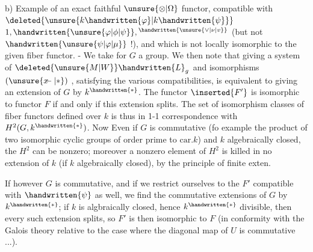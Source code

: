 
b) Example of an exact faithful $\unsure{\otimes|\Omega}$ functor, compatible with $\deleted{\unsure{k\handwritten{\varphi}|k\handwritten{\psi}}}$ $1,\handwritten{\unsure{\varphi|\phi|\psi}},{}^{\handwritten{\unsure{\vee|\nu|v}}}$ (but not  $\handwritten{\unsure{\psi|\varphi|\mu}}$ !), and which is not locally isomorphic to the given fiber functor. - We take for $G$ a group. We then note that giving a system of $\deleted{\unsure{M|W}}\handwritten{L}_{g}$ and isomorphisms $(\unsure{\rlap{\(x\)}-|*})$ , satisfying the various compatibilities, is equivalent to giving an extension of $G$ by $k^{\handwritten{*}}$. The functor $\inserted{F'}$ is isomorphic to  functor $F$ if and only if this extension splits. The set of isomorphism classes of fiber functors defined over $k$ is thus in 1-1 correspondence with $H^{2}(G,k^{\handwritten{*}})$. Now Even if $G$ is commutative (fo example the product of two isomorphic cyclic groups of order prime to  $\mathrm{car}.k$) and $k$ algebraically closed, the $H^{2}$ can be nonzero;  moreover a nonzero element of $H^{2}$ is killed in no extension of $k$ (if $k$ algebraically closed), by the principle of finite exten.

If however $G$ is commutative, and if we restrict ourselves to the $F'$ compatible with $\handwritten{\psi}$ as well, we find the commutative extensions of $G$ by $k^{\handwritten{*}}$; if $k$ is algbraically closed, hence $k^{\handwritten{*}}$ divisible, then every such extension splits, so $F'$ is then isomorphic to $F$ (in conformity with the Galois theory relative to the case where the diagonal map of $U$ is commutative ...).

